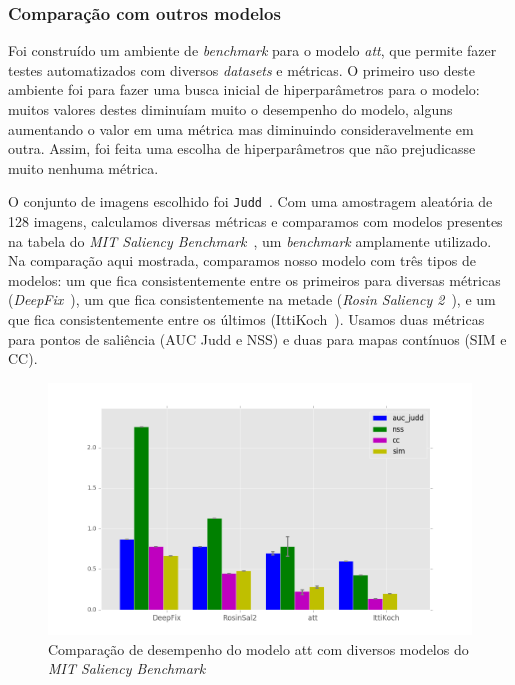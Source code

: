 \documentclass[article]{IEEEtran}
\newcommand{\tit}[1]{\textit{#1}}
\newcommand{\ttt}[1]{\texttt{#1}}
\begin{document}
\subsubsection{Comparação com outros modelos}
Foi construído um ambiente de \tit{benchmark} para o modelo \tit{att},
que permite fazer testes automatizados com diversos \tit{datasets} e métricas.
O primeiro uso deste ambiente foi para fazer uma busca inicial de
hiperparâmetros para o modelo: muitos valores destes diminuíam muito o
desempenho do modelo, alguns aumentando o valor em uma métrica mas
diminuindo consideravelmente em outra. Assim, foi feita uma escolha de
hiperparâmetros que não prejudicasse muito nenhuma métrica.

O conjunto de imagens escolhido foi \ttt{Judd}~\cite{juddBM}.
Com uma amostragem aleatória de 128 imagens, calculamos diversas métricas
e comparamos com modelos presentes na tabela do
\tit{MIT Saliency Benchmark}~\cite{mitsal}, um \tit{benchmark}
amplamente utilizado.
Na comparação aqui mostrada, comparamos nosso modelo com três tipos de
modelos: um que fica consistentemente entre os primeiros para diversas
métricas (\tit{DeepFix}~\cite{DeepFix}), um que fica consistentemente na metade
(\tit{Rosin Saliency 2}~\cite{rosinsal2}),
e um que fica consistentemente entre os últimos (IttiKoch~\cite{itti}).
Usamos duas métricas para pontos de saliência (AUC Judd e NSS) e duas para
mapas contínuos (SIM e CC).
\begin{figure}[H]
\begin{center}
    \includegraphics[width=1.1\linewidth]{img/comp.png}
\end{center}
\caption{Comparação de desempenho do modelo att com diversos modelos
do \tit{MIT Saliency Benchmark}}
\label{fig:comp}
\end{figure}
\end{document}

